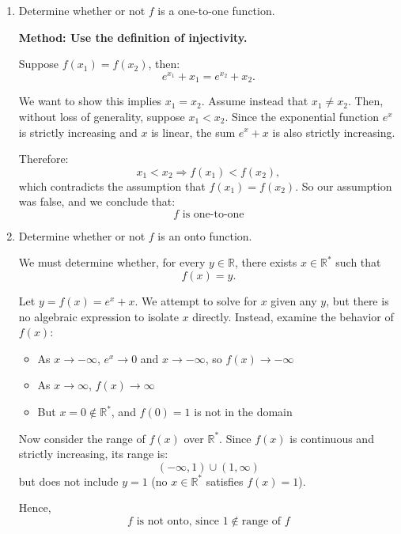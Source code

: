 \documentclass{article}
\begin{document}
\begin{enumerate}[label=\roman*.]

\item Determine whether or not \( f \) is a one-to-one function.

\textbf{Method: Use the definition of injectivity.}

Suppose \( f(x_1) = f(x_2) \), then:
\[
e^{x_1} + x_1 = e^{x_2} + x_2.
\]

We want to show this implies \( x_1 = x_2 \).  
Assume instead that \( x_1 \neq x_2 \). Then, without loss of generality, suppose \( x_1 < x_2 \).  
Since the exponential function \( e^x \) is strictly increasing and \( x \) is linear, the sum \( e^x + x \) is also strictly increasing.

Therefore:
\[
x_1 < x_2 \Rightarrow f(x_1) < f(x_2),
\]
which contradicts the assumption that \( f(x_1) = f(x_2) \).  
So our assumption was false, and we conclude that:
\[
\boxed{f \text{ is one-to-one}}
\]

\item Determine whether or not \( f \) is an onto function.

We must determine whether, for every \( y \in \mathbb{R} \), there exists \( x \in \mathbb{R}^* \) such that
\[
f(x) = y.
\]

Let \( y = f(x) = e^x + x \).  
We attempt to solve for \( x \) given any \( y \), but there is no algebraic expression to isolate \( x \) directly.  
Instead, examine the behavior of \( f(x) \):

\begin{itemize}
  \item As \( x \to -\infty \), \( e^x \to 0 \) and \( x \to -\infty \), so \( f(x) \to -\infty \)
  \item As \( x \to \infty \), \( f(x) \to \infty \)
  \item But \( x = 0 \notin \mathbb{R}^* \), and \( f(0) = 1 \) is not in the domain
\end{itemize}

Now consider the range of \( f(x) \) over \( \mathbb{R}^* \). Since \( f(x) \) is continuous and strictly increasing, its range is:
\[
(-\infty, 1) \cup (1, \infty)
\]
but does not include \( y = 1 \) (no \( x \in \mathbb{R}^* \) satisfies \( f(x) = 1 \)).

Hence,
\[
\boxed{f \text{ is not onto, since } 1 \notin \text{range of } f}
\]

\end{enumerate}
\end{document}
